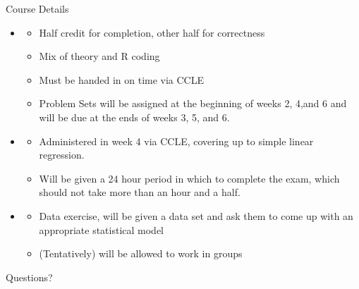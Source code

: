 \documentclass[notheorems,9pt]{beamer}
\begin{document}
\begin{frame}{Course Details} 
	\begin{itemize}
		\item<1-> 
		\begin{itemize}
			\item Half credit for completion, other half for correctness
			\item Mix of theory and R coding
			\item Must be handed in on time via CCLE
			\item Problem Sets will be assigned at the beginning of weeks 2, 4,and 6 and will be due at the ends of weeks 3, 5, and 6.
		\end{itemize}
		\item<2-> 
		\begin{itemize}
			\item Administered in week 4 via CCLE, covering up to simple linear regression.
			\item Will be given a 24 hour period in which to complete the exam, which should not take more than an hour and a half.
		\end{itemize}
		\item<3-> 
		\begin{itemize}
			\item Data exercise, will be given a data set and ask them to come up with an appropriate statistical model
			\item (Tentatively) will be allowed to work in groups
		\end{itemize}
	\end{itemize}
\end{frame}

\begin{frame}{Questions?} 
	\centering{} 
\end{frame}
\end{document}
